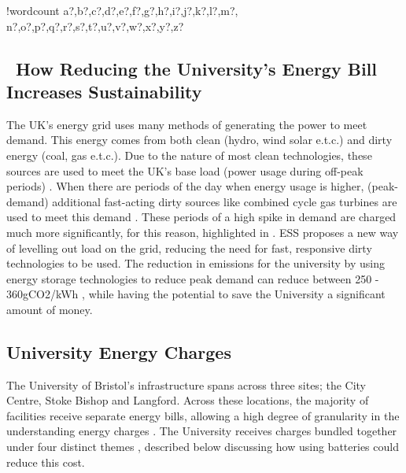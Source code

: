 \documentclass[fontsize=9.5pt]{extarticle}
\numberwithin{figure}{section} %
\newcounter{words}
\newenvironment{counted}{%
  \setcounter{words}{0}
  \SearchList!{wordcount}{\stepcounter{words}}
    {a?,b?,c?,d?,e?,f?,g?,h?,i?,j?,k?,l?,m?,
    n?,o?,p?,q?,r?,s?,t?,u?,v?,w?,x?,y?,z?}
  \UndoBoundary{'}
  \SearchOrder{p;}}{%
  \StopSearching}
\begin{document}
\begin{counted}
\subsection{~How Reducing the University's Energy Bill Increases
Sustainability}\label{how-reducing-the-universitys-energy-bill-increases-sustainability}

The UK's energy grid uses many methods of generating the power to meet
demand. This energy comes from both clean (hydro, wind solar e.t.c.) and
dirty energy (coal, gas e.t.c.). Due to the nature of most clean
technologies, these sources are used to meet the UK's base load (power
usage during off-peak periods) \cite{GBNation22:online}. When there are
periods of the day when energy usage is higher, (peak- demand)
additional fast-acting dirty sources like combined cycle gas turbines
are used to meet this demand \cite{Reducing94:online}. These periods of
a high spike in demand are charged much more significantly, for this
reason, highlighted in \cite{7555793}. ESS proposes a new way of
levelling out load on the grid, reducing the need for fast, responsive
dirty technologies to be used. The reduction in emissions for the
university by using energy storage technologies to reduce peak demand
can reduce between 250 - 360gCO2/kWh \cite{Part1Att26:online}, while
having the potential to save the University a significant amount of
money.

\subsection{University Energy Charges}\label{university-energy-charges}

The University of Bristol's infrastructure spans across three sites; the
City Centre, Stoke Bishop and Langford. Across these locations, the
majority of facilities receive separate energy bills, allowing a high
degree of granularity in the understanding energy charges
\cite{Jbrentmeet}. The University receives charges bundled together
under four distinct themes \cite{Jbrentmeet}, described below discussing
how using batteries could reduce this cost.


\end{counted}
\end{document}
